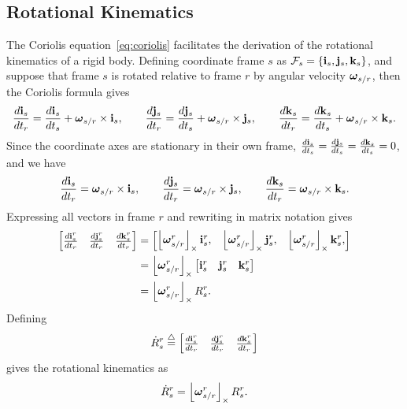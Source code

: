 \subsection{Rotational Kinematics} 

The Coriolis equation~\eqref{eq:coriolis}
facilitates the derivation of the rotational kinematics of a rigid body.  Defining coordinate frame $s$ as $\mathcal{F}_s = \{\mathbf{i}_s, \mathbf{j}_s, \mathbf{k}_s\}$,
and suppose that frame $s$ is rotated relative to frame $r$ by angular velocity $\boldsymbol{\omega}_{s/r}$, then the Coriolis formula gives
\[
\frac{d\mathbf{i}_s}{dt_r} = \frac{d\mathbf{i}_s}{dt_s} + \boldsymbol{\omega}_{s/r}\times\mathbf{i}_s, \qquad 
\frac{d\mathbf{j}_s}{dt_r} = \frac{d\mathbf{j}_s}{dt_s} + \boldsymbol{\omega}_{s/r}\times\mathbf{j}_s, \qquad 
\frac{d\mathbf{k}_s}{dt_r} = \frac{d\mathbf{k}_s}{dt_s} + \boldsymbol{\omega}_{s/r}\times\mathbf{k}_s.
\]
Since the coordinate axes are stationary in their own frame, $\frac{d\mathbf{i}_s}{dt_s}=\frac{d\mathbf{j}_s}{dt_s}=\frac{d\mathbf{k}_s}{dt_s}=0$, and we have
\[
\frac{d\mathbf{i}_s}{dt_r} = \boldsymbol{\omega}_{s/r}\times\mathbf{i}_s, \qquad 
\frac{d\mathbf{j}_s}{dt_r} = \boldsymbol{\omega}_{s/r}\times\mathbf{j}_s, \qquad 
\frac{d\mathbf{k}_s}{dt_r} = \boldsymbol{\omega}_{s/r}\times\mathbf{k}_s.
\]
Expressing all vectors in frame $r$ and rewriting in matrix notation gives
\begin{align*}
\begin{bmatrix} \frac{d\mathbf{i}_s^r}{dt_r} & \frac{d\mathbf{j}_s^r}{dt_r} & \frac{d\mathbf{k}_s^r}{dt_r} \end{bmatrix} 
&= \begin{bmatrix} \left\lfloor\boldsymbol{\omega}_{s/r}^r\right\rfloor_{\times}\mathbf{i}_s^r, & \left\lfloor\boldsymbol{\omega}_{s/r}^r\right\rfloor_{\times}\mathbf{j}_s^r, & \left\lfloor\boldsymbol{\omega}_{s/r}^r\right\rfloor_{\times}\mathbf{k}_s^r, \end{bmatrix}  \\
&= \left\lfloor\boldsymbol{\omega}_{s/r}^r\right\rfloor_{\times} \begin{bmatrix} \mathbf{i}_s^r & \mathbf{j}_s^r & \mathbf{k}_s^r \end{bmatrix}  \\
&= \left\lfloor\boldsymbol{\omega}_{s/r}^r\right\rfloor_{\times} R_s^r. 
\end{align*}
Defining 
\[
\dot{R}_s^r \stackrel{\triangle}{=} \begin{bmatrix} \frac{d\mathbf{i}_s^r}{dt_r} & \frac{d\mathbf{j}_s^r}{dt_r} & \frac{d\mathbf{k}_s^r}{dt_r} \end{bmatrix}
\]
gives the rotational kinematics as
\begin{equation}\label{eq:rotational_kinematics_1}
\dot{R}_s^r = \ss{\omegabf_{s/r}^r} R_s^r.
\end{equation}

